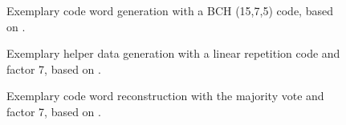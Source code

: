 \begin{figure}[h]
\centering
{}
\caption{Exemplary code word generation with a BCH (15,7,5) code, based on \cite{10}.}
\label{img:4_BCH_concept}
\end{figure}

\begin{figure}[h]
\centering
{}
\caption{Exemplary helper data generation with a linear repetition code and factor 7, based on \cite{10}.}
\label{img:4_LR_HD}
\end{figure}

\begin{figure}[h]
\centering
{}
\caption{Exemplary code word reconstruction with the majority vote and factor 7, based on \cite{10}.}
\label{img:4_MV_codewords}
\end{figure}

